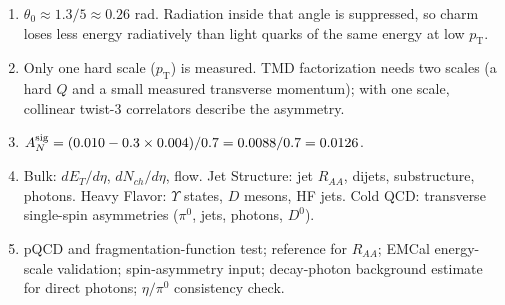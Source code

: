 \documentclass[11pt,letterpaper]{article}
\newcommand{\pT}{p_{\mathrm{T}}}
\newcommand{\RAA}{R_{AA}}
\begin{document}
\begin{enumerate}[label=A\arabic*.]
sequential melting. The $2S$ and $1S$ peaks are only 563 MeV apart at 10 GeV, so the mass resolution must be well below 100 MeV.
\item $\theta_0\approx1.3/5\approx0.26$ rad. Radiation inside that angle is suppressed, so charm loses less energy radiatively
than light quarks of the same energy at low $\pT$.
\item Only one hard scale ($\pT$) is measured. TMD factorization needs two scales (a hard $Q$ and a small measured
transverse momentum); with one scale, collinear twist-3 correlators describe the asymmetry.
\item $A_N^{\rm sig}=(0.010-0.3\times0.004)/0.7=0.0088/0.7=0.0126$.
\item Bulk: $dE_T/d\eta$, $dN_{ch}/d\eta$, flow. Jet Structure: jet $\RAA$, dijets, substructure, photons. Heavy Flavor:
$\Upsilon$ states, $D$ mesons, HF jets. Cold QCD: transverse single-spin asymmetries ($\pi^0$, jets, photons, $D^0$).
\item pQCD and fragmentation-function test; reference for $\RAA$; EMCal energy-scale validation; spin-asymmetry input; decay-photon
background estimate for direct photons; $\eta/\pi^0$ consistency check.
\end{enumerate}
\end{document}
